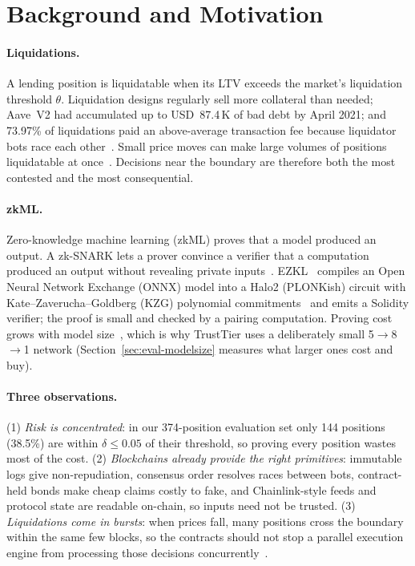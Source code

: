\documentclass[sigconf,nonacm]{acmart}
\begin{document}
\section{Background and Motivation}
\label{sec:background}

\paragraph{Liquidations.} A lending position is liquidatable when its LTV exceeds the market's liquidation threshold $\theta$. Liquidation designs regularly sell more collateral than needed; Aave~V2 had accumulated up to USD~87.4\,K of bad debt by April 2021; and 73.97\% of liquidations paid an above-average transaction fee because liquidator bots race each other~\cite{qin2021liquidations}. Small price moves can make large volumes of positions liquidatable at once~\cite{perez2021knife}. Decisions near the boundary are therefore both the most contested and the most consequential.

\paragraph{zkML.} Zero-knowledge machine learning (zkML) proves that a model produced an output. A zk-SNARK lets a prover convince a verifier that a computation produced an output without revealing private inputs~\cite{groth2016size,gabizon2019plonk}. EZKL~\cite{ezkl} compiles an Open Neural Network Exchange (ONNX) model into a Halo2 (PLONKish) circuit with Kate--Zaverucha--Goldberg (KZG) polynomial commitments~\cite{kate2010kzg} and emits a Solidity verifier; the proof is small and checked by a pairing computation. Proving cost grows with model size~\cite{peng2025survey,chen2024zkml}, which is why TrustTier uses a deliberately small 5$\to$8$\to$1 network (Section~\ref{sec:eval-modelsize} measures what larger ones cost and buy).

\paragraph{Three observations.} (1) \emph{Risk is concentrated}: in our 374-position evaluation set only 144 positions (38.5\%) are within $\delta\le0.05$ of their threshold, so proving every position wastes most of the cost. (2) \emph{Blockchains already provide the right primitives}: immutable logs give non-repudiation, consensus order resolves races between bots, contract-held bonds make cheap claims costly to fake, and Chainlink-style feeds and protocol state are readable on-chain, so inputs need not be trusted. (3) \emph{Liquidations come in bursts}: when prices fall, many positions cross the boundary within the same few blocks, so the contracts should not stop a parallel execution engine from processing those decisions concurrently~\cite{gelashvili2023blockstm}.
\end{document}
